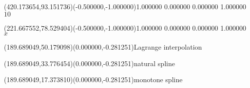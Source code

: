 \documentclass[12pt]{article}
\begin{document}
\ASYalignT(420.173654,93.151736)(-0.500000,-1.000000){1.000000 0.000000 0.000000 1.000000}{\vphantom{$10^4$}$10$}%
%
%
\fontsize{12.000000}{14.400000}\selectfont%
\ASYalignT(221.667552,78.529404)(-0.500000,-1.000000){1.000000 0.000000 0.000000 1.000000}{$x$}%
%
%
\fontsize{12.000000}{14.400000}\selectfont%
\ASYalign(189.689049,50.179098)(0.000000,-0.281251){Lagrange interpolation}%
%
%
\fontsize{12.000000}{14.400000}\selectfont%
\ASYalign(189.689049,33.776454)(0.000000,-0.281251){natural spline}%
%
%
\fontsize{12.000000}{14.400000}\selectfont%
\ASYalign(189.689049,17.373810)(0.000000,-0.281251){monotone spline}%
\end{document}
